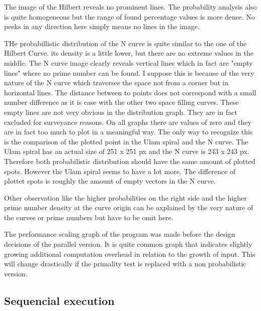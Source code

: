 The image of the Hilbert reveals no prominent lines. The probability analysis also is quite homogeneous but the range of found percentage values is more dense. No peeks in any direction here simply means no lines in the image.

THe probabillistic distribution of the N curve is quite similar to the one of the Hilbert Curve. its density is a little lower, but there are no extreme values in the middle. The N curve image clearly reveals vertical lines which in fact are "empty lines" where no prime number can be found. I suppose this is because of the very nature of the N curve which traverses the space not from a corner but in horizontal lines. The distance between to points does not correspond with a small number difference as it is case with the other two space filling curves.
These empty lines are not very obvious in the distribution graph. They are in fact excluded for surveyance reasons. On all graphs there are values of zero and they are in fact too much to plot in a meaningful way. The only way to recognize this is the comparison of the plotted point in the Ulam spiral and the N curve. The Ulam spiral has an actual size of 251 x 251 px and the N curve is 243 x 243 px. Therefore both probabilistic distribution should have the same amount of plotted spots. However the Ulam spiral seems to have a lot more. The difference of plottet spots is roughly the amount of empty vectors in the N curve.

Other observation like the higher probabilities on the right side and the higher prime number density at the curve origin can be axplained by the very nature of the curves or prime numbers but have to be omit here.

The performance scaling graph of the program was made before the design decisions of the parallel version. It is quite common graph that indicates slightly growing additional computation overhead in relation to the growth of input. This will change drastically if the primality test is replaced with a non probabilistic version.

\subsection{Sequencial execution}
\label{sec:seq_ex}

